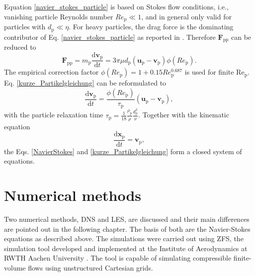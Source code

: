 \documentclass[11pt,a4paper,openany,oneside,parskip=half*]{article}
\renewcommand*\vec[1]{\boldsymbol{#1}}
\begin{document}
Equation \eqref{navier_stokes_particle} is based on Stokes flow conditions, i.e., vanishing particle Reynolds number $Re_\mathrm{p} \ll 1$, and in general only valid for particles with $d_\mathrm{p} \ll \eta$.
For heavy particles, the drag force is the dominating contributor of Eq. \eqref{navier_stokes_particle} as reported in \cite{TheImportanceOfTheFocusActingOnParticlesInTurbulentFlows}. Therefore $\vec{F}_\mathrm{pp}$ can be reduced to
\begin{equation} \label{kurze_Partikelgleichung}
\vec{F}_\mathrm{pp} =  m_\mathrm{p} \frac{\mathrm{d}\vec{v}_\mathrm{p}}{\mathrm{d}t} = 3 \pi \mu d_\mathrm{p}(\vec{u}_\mathrm{p}-\vec{v}_\mathrm{p})\phi(Re_\mathrm{p}).
\end{equation}
The empirical correction factor $\phi(Re_\mathrm{p}) = 1+0.15Re_\mathrm{p}^\mathrm{0.687}$ is used for finite $\mathrm{Re_\mathrm{p}}$. \newline Eq. \eqref{kurze_Partikelgleichung} can be reformulated to
\begin{equation} \label{shortPaticleDynamics}
\frac{\mathrm{d}\vec{v}_\mathrm{p}}{\mathrm{d}t} = \frac{\phi(Re_\mathrm{p})}{\tau_\mathrm{p}}(\vec{u}_\mathrm{p}-\vec{v}_\mathrm{p}),
\end{equation}
with the particle relaxation time $\tau_\mathrm{p}=\frac{1}{18}\frac{\rho_\mathrm{p}}{\rho}\frac{d_\mathrm{p}^\mathrm{2}}{\nu}$. 
\newline
Together with the kinematic equation    
\begin{equation}
 \frac{\mathrm{d}\vec{x}_\mathrm{p}}{\mathrm{d}t} = \vec{v}_\mathrm{p},
\end{equation}
the Eqs.  \eqref{NavierStokes} and \eqref{kurze_Partikelgleichung} form a closed system of equations.
\pagebreak
\section{Numerical methods} %
Two numerical methods, DNS and LES, are discussed and their main differences are pointed out in the following chapter. The basis of both are the Navier-Stokes equations as described above. The simulations were carried out using ZFS, the simulation tool developed and implemented at the Institute of Aerodynamics at RWTH Aachen University 
\cite{anAdaptiveMultilevelMultigridFormulationForCartesianHierarchicalGridMethods, aStrictlyConservativeCartesianCutCellMethodForCompressibleViscousFlowsOnAdaptiveGrids}. 
The tool is capable of simulating compressible finite-volume flows using unstructured Cartesian grids.
\newline
\end{document}
